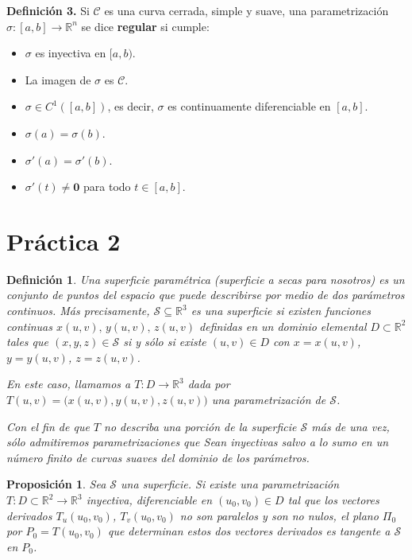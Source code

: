 \documentclass[11pt,a4paper,pdftex]{amsart}
\newtheorem{definition}{Definición}[section]
\newtheorem{prop}{Proposición}[section]
\newcommand{\C}{\mathcal C}
\newcommand{\R}{\mathbb R}
\newcommand{\0}{\mathbb O}
\newcommand{\Su}{\mathcal{S}}
\newcommand{\8}{\infty}
\begin{document}
\bigskip

\noindent\textbf{Definici\'on 3.}  
Si $\C$ es una curva cerrada, simple y suave, una parametrizaci\'on $\sigma : [a, b] \to \mathbb{R}^n$ se dice \textbf{regular} si cumple:  
\begin{itemize}
    \item $\sigma$ es inyectiva en $[a, b)$.
    \item La imagen de $\sigma$ es $\C$.
    \item $\sigma \in C^1([a, b])$, es decir, $\sigma$ es continuamente diferenciable en $[a, b]$.
    \item $\sigma(a) = \sigma(b)$.
    \item $\sigma'(a) = \sigma'(b)$.
    \item $\sigma'(t) \neq \mathbf{0}$ para todo $t \in [a, b]$.
\end{itemize}



\section{Práctica 2}


\begin{definition} Una superficie paramétrica (superficie a secas para nosotros) es un conjunto de puntos del espacio que puede describirse por medio de dos parámetros continuos. Más precisamente, $\Su \subseteq \mathbb{R}^3$ es una superficie si existen funciones continuas $x(u,v),\,y(u,v),\,z(u,v)$ definidas en un dominio elemental $D\subset\R^2$ tales que
 $(x,y,z)\in\Su$ si y sólo si existe $(u,v)\in D$ con $x=x(u,v)$, $y=y(u,v)$, $z=z(u,v)$.

 En este caso, llamamos a $T:D\to\R^3$ dada por $T(u,v)=\big(x(u,v),y(u,v),z(u,v)\big)$ una parametrización de $\Su$.

 Con el fin de que $T$ no describa una porción de la superficie $\Su$ más de una vez, sólo admitiremos parametrizaciones que
 Sean inyectivas salvo a lo sumo en un número finito de curvas suaves del dominio de los parámetros.
\end{definition}

\begin{prop} Sea $\Su$ una superficie. Si existe una parametrización $T:D\subset\R^2\to\R^3$ inyectiva, diferenciable en $(u_0,v_0)\in D$ tal que los vectores derivados $T_u(u_0,v_0)$, $T_v(u_0,v_0)$ no son paralelos y son no nulos, el plano $\Pi_0$ por $P_0=T(u_0,v_0)$ que determinan estos dos vectores derivados es tangente a $\Su$ en $P_0$.
\end{prop}
\end{document}
